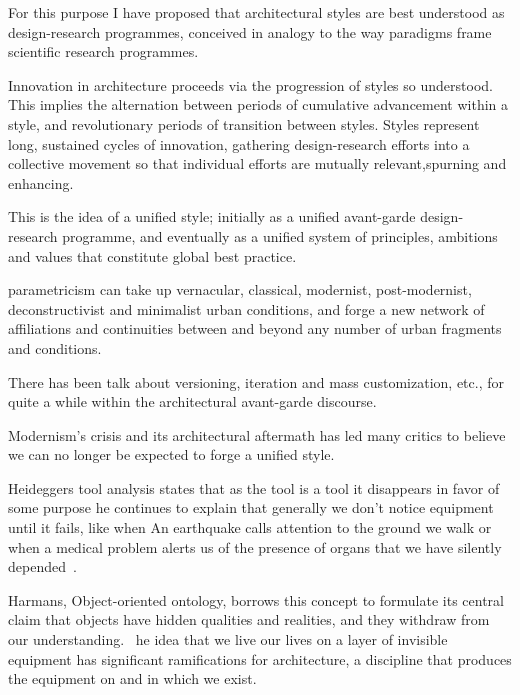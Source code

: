 For this purpose I have proposed that architectural styles are best understood as design-research programmes, conceived in analogy to the way paradigms frame scientific research programmes.~\cite{Schumacher2010}


Innovation in architecture proceeds via the progression of styles so understood.
This implies the alternation between periods of cumulative advancement within a style, and revolutionary periods of transition between styles.
Styles represent long, sustained cycles of innovation, gathering design-research efforts into a collective movement so that individual efforts are mutually relevant,spurning and enhancing.\cite{Schumacher2010}

This is the idea of a unified style;
initially as a unified avant-garde design-research programme, and eventually as a unified system of principles, ambitions and values that constitute global best practice.\cite{Schumacher2010}


parametricism can take up vernacular, classical, modernist, post-modernist, deconstructivist and minimalist urban conditions, and forge a new network of affiliations and continuities between and beyond any number of urban fragments and conditions.~\cite{Schumacher2010}


There has been talk about versioning, iteration and mass customization, etc., for quite a while within the architectural avant-garde discourse.~\cite{Schumacher2008}

Modernism’s crisis and its architectural aftermath has led many critics to believe we can no longer be expected to forge a unified style.~\cite{Schumacher2010}

Heideggers tool analysis states that as the tool is a tool it disappears in favor of some purpose he continues to explain that generally we don't notice equipment until it fails, like when An earthquake calls attention to the ground we walk or when a medical problem alerts us of the presence of organs that we have silently depended~\cite{Harman2011}.

Harmans, Object-oriented ontology, borrows this concept to formulate its central claim that objects have hidden qualities and realities, and they withdraw from our understanding.~\cite{Gage2015}
he idea that we live our lives on a layer of invisible equipment has significant ramifications for architecture, a discipline that produces the equipment on and in which we exist.~\cite{Gage2015}

